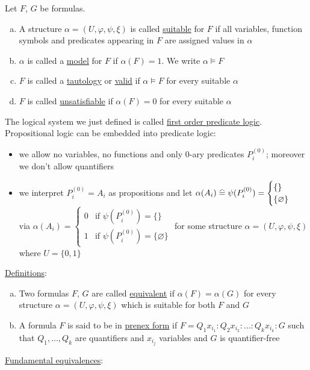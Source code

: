 \documentclass[a4paper]{article}
\renewcommand\hateq{\mathrel{\stackon[1.5pt]{=}{\stretchto{%
				\scalerel*[\widthof{=}]{\wedge}{\rule{1ex}{3ex}}}{0.5ex}}}}
\newcommand{\ul}{\underline}
\let\phi\varphi
\begin{document}
Let $F$, $G$ be formulas.
\begin{enumerate}[(a)]
	\item A structure $\alpha=(U,\phi,\psi,\xi)$ is called \ul{suitable} for $F$ if all variables, function symbols and predicates appearing in $F$ are assigned values in $\alpha$
	\item $\alpha$ is called a \ul{model} for $F$ if $\alpha(F)=1$. We write $\alpha\models F$
	\item $F$ is called a \ul{tautology} or \ul{valid} if $\alpha\models F$ for every suitable $\alpha$
	\item $F$ is called \ul{unsatisfiable} if $\alpha(F)=0$ for every suitable $\alpha$
\end{enumerate}
The logical system we just defined is called \ul{first order predicate logic}.\\
Propositional logic can be embedded into predicate logic:
\begin{itemize}
	\item we allow no variables, no functions and only 0-ary predicates $P_i^{(0)}$; moreover we don't allow quantifiers
	\item we interpret $P_i^{(0)}=A_i$ as propositions and let $\alpha(A_i)\hateq\psi(P_i^{(0)})=\begin{cases}
	\{\}\\
	\{\varnothing\}
	\end{cases}$ via $\alpha(A_i)=\begin{cases}
	0 & \text{if }\psi(P_i^{(0)})=\{\}\\
	1 & \text{if }\psi(P_i^{(0)})=\{\varnothing\}
	\end{cases}$ for some structure $\alpha=(U,\phi,\psi,\xi)$ where $U=\{0,1\}$
\end{itemize}
\ul{Definitions}:
\begin{enumerate}[(a)]
	\item Two formulas $F$, $G$ are called \ul{equivalent} if $\alpha(F)=\alpha(G)$ for every structure $\alpha=(U,\phi,\psi,\xi)$ which is suitable for both $F$ and $G$
	\item  A formula $F$ is said to be in \ul{prenex form} if $F=Q_1x_{i_1}:Q_2x_{i_2}:\dots:Q_kx_{i_k}:G$ such that $Q_1,\dots,Q_k$ are quantifiers and $x_{i_j}$ variables and $G$ is quantifier-free
\end{enumerate}
\ul{Fundamental equivalences}:
\end{document}
